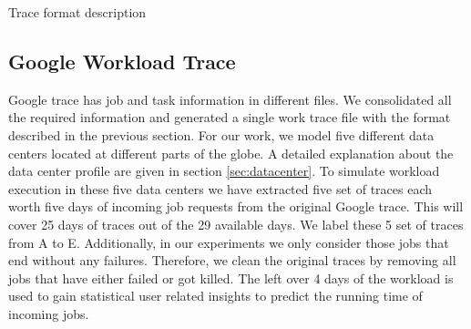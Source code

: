 \documentclass[conference,12pt]{IEEEtran}
\begin{document}
\begin {table}[]
\centering
    \caption {Trace format description} \label{tab:format} 
\end{table}

\subsection{Google Workload Trace} \label{googletrace}
Google trace has job and task information in different files. We consolidated all the required information and generated a single work trace file with the format described in the previous section. For our work, we model five different data centers located at different parts of the globe. A detailed explanation about the data center profile are given in section \ref{sec:datacenter}. To simulate workload execution in these five data centers we have extracted five set of traces each worth five days of incoming job requests from the original Google trace. This will cover 25 days of traces out of the 29 available days. We label these 5 set of traces from A to E.   Additionally,  in our  experiments  we  only  consider  those  jobs  that end  without  any  failures.  Therefore,  we  clean  the original  traces  by  removing  all  jobs  that  have  either failed or got killed. The left over 4 days of the workload is used to gain statistical user related insights to predict the running time of incoming jobs. 
\end{document}
